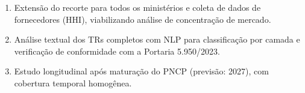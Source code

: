 \documentclass[12pt]{article}
\begin{document}
\begin{enumerate}
\item Extensão do recorte para todos os ministérios e coleta de dados de fornecedores (HHI), viabilizando análise de concentração de mercado.
\item Análise textual dos TRs completos com NLP para classificação por camada e verificação de conformidade com a Portaria 5.950/2023.
\item Estudo longitudinal após maturação do PNCP (previsão: 2027), com cobertura temporal homogênea.
\end{enumerate}



\end{document}
